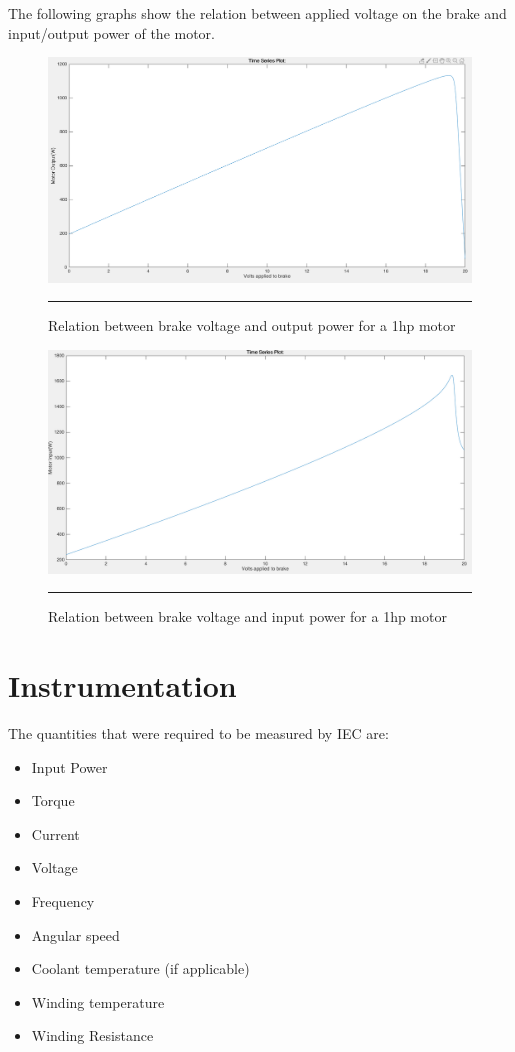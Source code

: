 The following graphs show the relation between applied voltage on the brake and input/output power of the motor.
\begin{figure}[htbp]
	\centering
		\includegraphics[width = 4.5in]{./Figures/MS/fig322.png}
		\rule{35em}{0.5pt}
	\caption{Relation between brake voltage and output power for a 1hp motor}
	\label{fig:Relation between brake voltage and output power for a 1hp motor}
\end{figure}
\begin{figure}[htbp]
	\centering
		\includegraphics[width = 4.5in]{./Figures/MS/fig323.png}
		\rule{35em}{0.5pt}
	\caption{Relation between brake voltage and input power for a 1hp motor}
	\label{fig:Relation between brake voltage and input power for a 1hp motor}
\end{figure}


\section{Instrumentation}
The quantities that were required to be measured by IEC are:
\begin{itemize}
	\item	Input Power
	\item	Torque
	\item	Current 
	\item	Voltage
	\item	Frequency
	\item	Angular speed
	\item	Coolant temperature (if applicable)
	\item	Winding temperature
	\item	Winding Resistance
\end{itemize}

